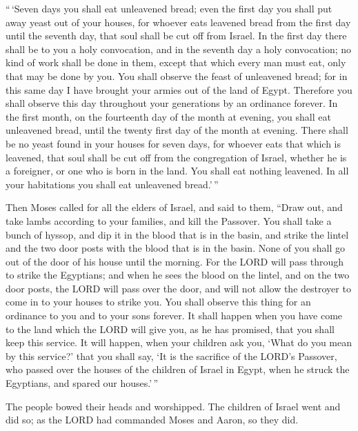  ``\,`Seven days you shall eat unleavened bread; even the
first day you shall put away yeast out of your houses, for whoever eats
leavened bread from the first day until the seventh day, that soul shall
be cut off from Israel.  In the first day there shall be to
you a holy convocation, and in the seventh day a holy convocation; no
kind of work shall be done in them, except that which every man must
eat, only that may be done by you.  You shall observe the
feast of unleavened bread; for in this same day I have brought your
armies out of the land of Egypt. Therefore you shall observe this day
throughout your generations by an ordinance forever.  In
the first month, on the fourteenth day of the month at evening, you
shall eat unleavened bread, until the twenty first day of the month at
evening.  There shall be no yeast found in your houses for
seven days, for whoever eats that which is leavened, that soul shall be
cut off from the congregation of Israel, whether he is a foreigner, or
one who is born in the land.  You shall eat nothing
leavened. In all your habitations you shall eat unleavened bread.'\,''

 Then Moses called for all the elders of Israel, and said
to them, ``Draw out, and take lambs according to your families, and kill
the Passover.  You shall take a bunch of hyssop, and dip it
in the blood that is in the basin, and strike the lintel and the two
door posts with the blood that is in the basin. None of you shall go out
of the door of his house until the morning.  For the LORD
will pass through to strike the Egyptians; and when he sees the blood on
the lintel, and on the two door posts, the LORD will pass over the door,
and will not allow the destroyer to come in to your houses to strike
you.  You shall observe this thing for an ordinance to you
and to your sons forever.  It shall happen when you have
come to the land which the LORD will give you, as he has promised, that
you shall keep this service.  It will happen, when your
children ask you, `What do you mean by this service?'  that
you shall say, `It is the sacrifice of the LORD's Passover, who passed
over the houses of the children of Israel in Egypt, when he struck the
Egyptians, and spared our houses.'\,''

The people bowed their heads and worshipped.  The children
of Israel went and did so; as the LORD had commanded Moses and Aaron, so
they did.

